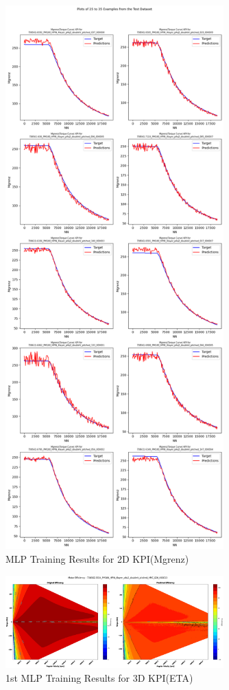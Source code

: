 \documentclass{report} %
\begin{document}
\begin{figure}[h]
    \centering
    \includegraphics[width=0.75\textwidth]{./ReportImages/kpi2d_predictions.png} 
    \caption{MLP Training Results for 2D KPI(Mgrenz)} 
    \label{fig:MLP Training Results for 2D KPI(Mgrenz)}
\end{figure}

\begin{figure}[h]
    \centering
    \includegraphics[width=0.75\textwidth]{./ReportImages/kpi3dprediction1.png} 
    \caption{1st MLP Training Results for 3D KPI(ETA)} 
    \label{fig:1st MLP Training Results for 3D KPI(ETA)}
\end{figure}
\end{document}
